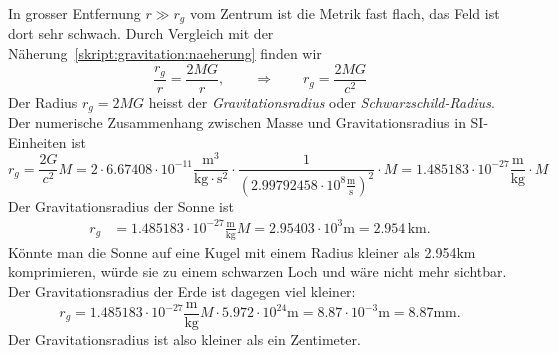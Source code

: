In grosser Entfernung $r \gg r_g$ vom Zentrum ist die Metrik fast flach,
das Feld ist dort sehr schwach.
Durch Vergleich mit der Näherung~\eqref{skript:gravitation:naeherung}
finden wir
\[
\frac{r_g}{r} = \frac{2MG}{r},
\qquad\Rightarrow\qquad
r_g=\frac{2MG}{c^2}
\]
Der Radius $r_g=2MG$ heisst der {\em Gravitationsradius} oder 
{\em Schwarzschild-Radius}.
Der numerische Zusammenhang zwischen Masse und Gravitationsradius
in SI-Einheiten ist
\[
r_g = \frac{2G}{c^2}M
=
2\cdot 6.67408\cdot10^{-11}
\frac{\text{m}^3}{\text{kg}\cdot\text{s}^2}
\cdot
\frac1{(2.99792458\cdot 10^{8}\frac{\text{m}}{\text{s}})^2}\cdot M
=
1.485183\cdot 10^{-27}\frac{\text{m}}{\text{kg}}\cdot M
\]
Der Gravitationsradius der Sonne ist 
\begin{align*}
r_g
&=
1.485183\cdot 10^{-27}\frac{\text{m}}{\text{kg}}M
=
2.95403\cdot 10^{3}\text{m}
=
2.954\,\text{km}.
\end{align*}
Könnte man die Sonne auf eine Kugel mit einem Radius kleiner als 2.954km
komprimieren, würde sie zu einem schwarzen Loch und wäre nicht mehr
sichtbar.
Der Gravitationsradius der Erde ist dagegen viel kleiner:
\[
r_g
=
1.485183\cdot 10^{-27}\frac{\text{m}}{\text{kg}}M
\cdot
5.972\cdot 10^{24}\text{m}
=
8.87\cdot 10^{-3}\text{m}
=
8.87\text{mm}.
\]
Der Gravitationsradius ist also kleiner als ein Zentimeter.




